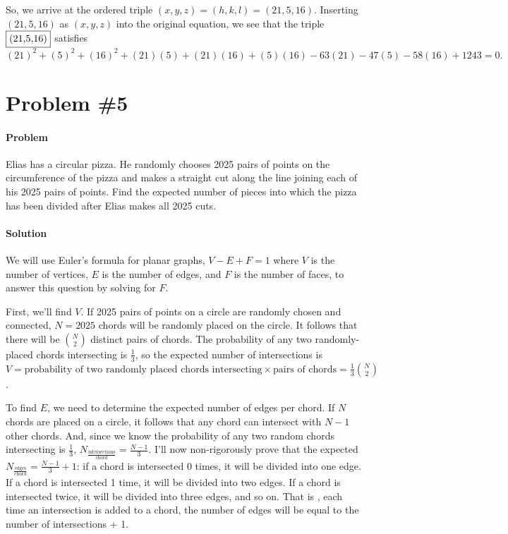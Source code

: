\documentclass[10pt]{article}
\theoremstyle{plain}
\theoremstyle{definition}
\theoremstyle{remark}
\begin{document}
So, we arrive at the ordered triple \((x,y,z)=(h,k,l)=(21,5,16)\). Inserting \((21,5,16)\) as \((x,y,z)\) into the original equation, we see that the triple \(\fbox{(21,5,16)}\) satisfies \[(21)^2+(5)^2+(16)^2+(21)(5)+(21)(16)+(5)(16)-63(21)-47(5)-58(16)+1243=0.\]

\section{Problem \#5}

\paragraph{Problem} Elias has a circular pizza. He randomly chooses 2025 pairs of points on the circumference of the pizza and makes a straight cut along the line joining each of his 2025 pairs of points. Find the expected number of pieces into which the pizza has been divided after Elias makes all 2025 cuts.

\paragraph{Solution} We will use Euler's formula for planar graphs, \(V-E+F=1\) where \(V\) is the number of vertices, \(E\) is the number of edges, and \(F\) is the number of faces, to answer this question by solving for \(F\).

First, we'll find \(V\). If 2025 pairs of points on a circle are randomly chosen and connected, \(N=2025\) chords will be randomly placed on the circle. It follows that there will be \(\binom{N}{2}\) distinct pairs of chords. The probability of any two randomly-placed chords intersecting is \(\frac{1}{3}\), so the expected number of intersections is \(V=\text{probability of two randomly placed chords intersecting} \times \text{pairs of chords}=\frac{1}{3}\binom{N}{2}\).

To find \(E\), we need to determine the expected number of edges per chord. If \(N\) chords are placed on a circle, it follows that any chord can intersect with \(N-1\) other chords. And, since we know the probability of any two random chords intersecting is \(\frac{1}{3}\), \(N_{\frac{\text{intersections}}{\text{chord}}}=\frac{N-1}{3}\). I'll now non-rigorously prove that the expected \(N_{\frac{\text{edges}}{\text{chord}}}=\frac{N-1}{3}+1\): if a chord is intersected 0 times, it will be divided into one edge. If a chord is intersected 1 time, it will be divided into two edges. If a chord is intersected twice, it will be divided into three edges, and so on. That is , each time an intersection is added to a chord, the number of edges will be equal to the number of intersections + 1.
\end{document}
